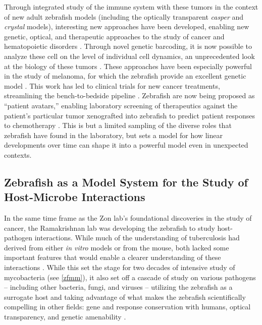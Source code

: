 Through integrated study of the immune system with these tumors in the context of new adult zebrafish models (including the optically transparent \textit{casper} and \textit{crystal} models), interesting new approaches have been developed, enabling new genetic, optical, and therapeutic approaches to the study of cancer \citep{Yan2021, Yan2019, Stern2003, GomezAbenza2019, Hason2019, White2013} and hematopoietic disorders \citep{deJong2011, Tang2014}. Through novel genetic barcoding, it is now possible to analyze these cell on the level of individual cell dynamics, an unprecedented look at the biology of these tumors \citep{Sankaran2022}. These approaches have been especially powerful in the study of melanoma, for which the zebrafish provide an excellent genetic model \citep{Kaufman2016}. This work has led to clinical trials for new cancer treatments, streamlining the bench\hyp{}to\hyp{}bedside pipeline \citep{Hanna2021}. Zebrafish are now being proposed as ``patient avatars,'' enabling laboratory screening of therapeutics against the patient's particular tumor xenografted into zebrafish to predict patient responses to chemotherapy \citep{Li2012, Yan2019, Fazio2020, Sertori2016, Sertori2022}. This is but a limited sampling of the diverse roles that zebrafish have found in the laboratory, but sets a model for how linear developments over time can shape it into a powerful model even in unexpected contexts.

\subsection{Zebrafish as a Model System for the Study of Host\hyp{}Microbe Interactions}\label{zfhmi}

In the same time frame as the Zon lab's foundational discoveries in the study of cancer, the Ramakrishnan lab was developing the zebrafish to study host\hyp{}pathogen interactions. While much of the understanding of tuberculosis had derived from either \textit{in vitro} models or from the mouse, both lacked some important features that would enable a clearer understanding of these interactions \citep{Davis2002}. While this set the stage for two decades of intensive study of mycobacteria (see \autoref{zfmm}), it also set off a cascade of study on various pathogens -- including other bacteria, fungi, and viruses -- utilizing the zebrafish as a surrogate host and taking advantage of what makes the zebrafish scientifically compelling in other fields: gene and response conservation with humans, optical transparency, and genetic amenability \citep{Kanther2010, Angosto2014, Levraud2014}.

